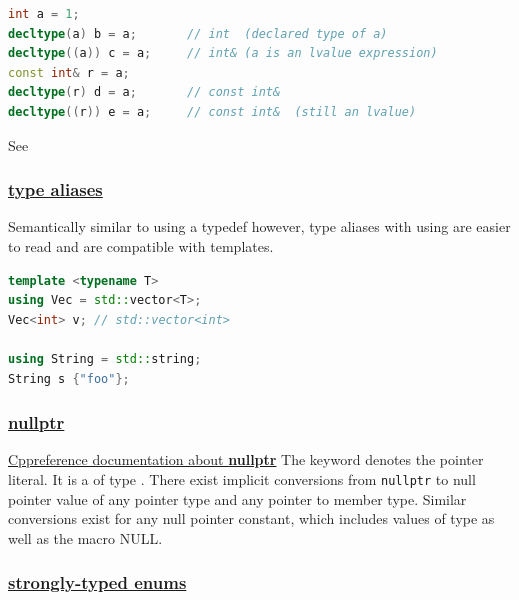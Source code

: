 \begin{lstlisting}[language=C++]
int a = 1;
decltype(a) b = a;       // int  (declared type of a)
decltype((a)) c = a;     // int& (a is an lvalue expression)
const int& r = a;
decltype(r) d = a;       // const int&
decltype((r)) e = a;     // const int&  (still an lvalue)
\end{lstlisting}

See~\cite{cppreference-decltype}


\subsubsection{\href{https://github.com/AnthonyCalandra/modern-cpp-features/tree/master\#type-aliases}
                    {type aliases}}
Semantically similar to using a typedef however, type aliases with using 
are easier to read and are compatible with templates.

\begin{lstlisting}[language=C++]
template <typename T>
using Vec = std::vector<T>;
Vec<int> v; // std::vector<int>

using String = std::string;
String s {"foo"};
\end{lstlisting}

\subsubsection{\href{https://github.com/AnthonyCalandra/modern-cpp-features/tree/master\#nullptr}
                    {nullptr}}
\href{https://en.cppreference.com/w/cpp/language/nullptr}{Cppreference documentation about \textbf{nullptr}}
\newline
The keyword  denotes the pointer literal. It is a 
 of type . 
There exist implicit conversions from \texttt{nullptr} to null pointer 
value of any pointer type and any pointer to member type. 
Similar conversions exist for any null pointer constant, 
which includes values of type  as well 
as the macro NULL.

\subsubsection{\href{https://github.com/AnthonyCalandra/modern-cpp-features/tree/master\#strongly-typed-enums}
                    {strongly-typed enums}}

